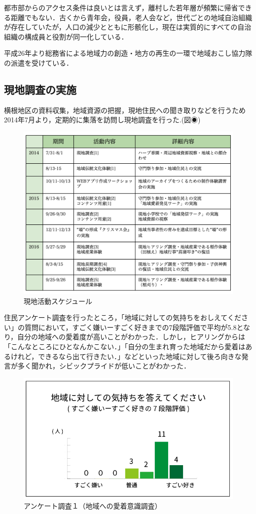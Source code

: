 \documentclass[a4paper]{jsarticle}
\begin{document}
都市部からのアクセス条件は良いとは言えず，離村した若年層が頻繁に帰省できる距離でもない．古くから青年会，役員，老人会など，世代ごとの地域自治組織が存在していたが，人口の減少とともに形骸化し，現在は実質的にすべての自治組織の構成員と役割が同一化している．\par
平成26年より総務省による地域力の創造・地方の再生の一環で地域おこし協力隊の派遣を受けている．
\subsection{現地調査の実施}
横根地区の資料収集，地域資源の把握，現地住民への聞き取りなどを行うため2014年7月より，定期的に集落を訪問し現地調査を行った.(図◉)

\begin{figure}[H]
  \begin{center}
    \includegraphics[width=1.0\hsize]{./images/18.png}
    \caption{現地活動スケジュール}
    \label{fig:tmu_hino}
  \end{center}
\end{figure}
住民アンケート調査を行ったところ，「地域に対しての気持ちをおしえてください」の質問において，すごく嫌いーすごく好きまでの7段階評価で平均が5.8となり，自分の地域への愛着度が高いことがわかった．しかし，ヒアリングからは「こんなところにひとなんかこない．」「自分の生まれ育った地域だから愛着はあるけれど，できるなら出て行きたい．」などといった地域に対して後ろ向きな発言が多く聞かれ，シビックプライドが低いことがわかった．

\begin{figure}[H]
  \begin{center}
    \includegraphics[width=0.6\hsize]{./images/03.png}
    \caption{アンケート調査１（地域への愛着意識調査）}
    \label{fig:tmu_hino}
  \end{center}
\end{figure}
\end{document}
